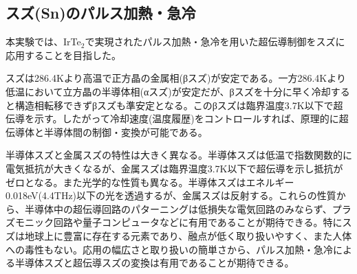 \subsection{スズ(Sn)のパルス加熱・急冷}
本実験では、IrTe$_2$で実現されたパルス加熱・急冷を用いた超伝導制御をスズに応用することを目指した。

スズは286.4Kより高温で正方晶の金属相(βスズ)が安定である。一方286.4Kより低温において立方晶の半導体相(αスズ)が安定だが、βスズを十分に早く冷却すると構造相転移できずβスズも準安定となる。このβスズは臨界温度3.7K以下で超伝導を示す。したがって冷却速度(温度履歴)をコントロールすれば、原理的に超伝導体と半導体間の制御・変換が可能である。

半導体スズと金属スズの特性は大きく異なる。半導体スズは低温で指数関数的に電気抵抗が大きくなるが、金属スズは臨界温度3.7K以下で超伝導を示し抵抗がゼロとなる。また光学的な性質も異なる。半導体スズはエネルギー0.018eV(4.4THz)以下の光を透過するが、金属スズは反射する。これらの性質から、半導体中の超伝導回路のパターニングは低損失な電気回路のみならず、プラズモニック回路や量子コンピュータなどに有用であることが期待できる。特にスズは地球上に豊富に存在する元素であり、融点が低く取り扱いやすく、また人体への毒性もない。応用の幅広さと取り扱いの簡単さから、パルス加熱・急冷による半導体スズと超伝導スズの変換は有用であることが期待できる。

